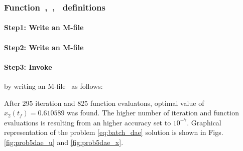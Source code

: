 \subsubsection{Function~,~,~  definitions}
\label{sec:example-fundef}

\paragraph{Step1: Write an M-file~}

{\small }

\paragraph{Step2: Write an M-file~}

{\small }

\paragraph{Step3: Invoke~} by writing an
M-file~ as follows:

{\small }

After 295 iteration and 825 function evaluatons, optimal value of
$x_{2}(t_{f}) = 0.610589$ was found. The higher number of iteration
and function evaluations is resulting from an higher accuracy set to
$10^{-7}$. Graphical representation of the problem
\eqref{eq:batch_dae} solution is shown in Figs. \ref{fig:prob5dae_u}
and \ref{fig:prob5dae_x}. 

